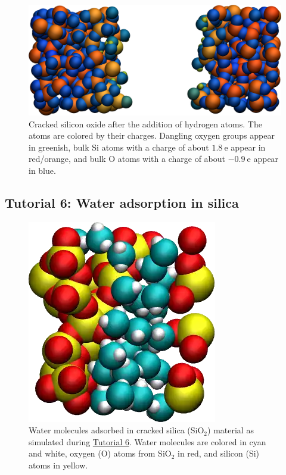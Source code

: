 \documentclass[9pt,tutorial]{livecoms}
\begin{document}
\begin{figure}
\includegraphics[width=\linewidth]{SIO-decorated}
\caption{Cracked silicon oxide after the addition of hydrogen atoms. The atoms are colored by their charges. Dangling oxygen groups appear in greenish, bulk Si atoms with a charge of about $1.8~\text{e}$  appear in red/orange, and bulk O atoms with a charge of about $-0.9 ~ \text{e}$ appear in blue.}
\label{fig:SIO-decorated}
\end{figure}

\subsection{Tutorial 6: Water adsorption in silica}
\label{gcmc-silica-label}

\begin{figure}
\centering
\includegraphics[width=0.55\linewidth]{GCMC}
\caption{Water molecules adsorbed in cracked silica (SiO$_2$) material as simulated during \hyperref[gcmc-silica-label]{Tutorial 6}. Water molecules are colored in cyan and white, oxygen (O) atoms from SiO$_2$ in red, and silicon (Si) atoms in yellow.}
\label{fig:GCMC}
\end{figure}
\end{document}
